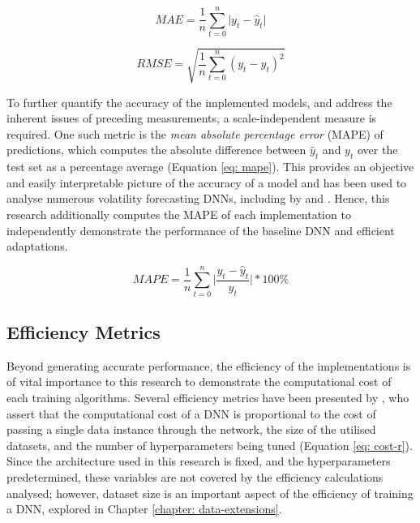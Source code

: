 \documentclass[a4paper, 11pt]{report}
\begin{document}
    \begin{equation}
        \label{eq: mae}
        MAE = \frac{1}{n} \sum_{t=0}^n \lvert y_t - \hat{y}_t \lvert
    \end{equation}
    
    \begin{equation}
        \label{eq: rmse}
        RMSE = \sqrt{\frac{1}{n} \sum_{t=0}^n (y_t - \hat{y}_t)^2}
    \end{equation}


    To further quantify the accuracy of the implemented models, and address the inherent issues of preceding measurements, a scale-independent measure is required. One such metric is the \emph{mean absolute percentage error }(MAPE) of predictions, which computes the absolute difference between $\hat{y}_t$ and $y_t$ over the test set as a percentage average (Equation \ref{eq: mape}). This provides an objective and easily interpretable picture of the accuracy of a model and has been used to analyse numerous volatility forecasting DNNs, including by \citet{xiong-2016} and \citet{zhang-2022}. Hence, this research additionally computes the MAPE of each implementation to independently demonstrate the performance of the baseline DNN and efficient adaptations.


    \begin{equation}
        \label{eq: mape}
        MAPE = \frac{1}{n} \sum_{t=0}^n \bigg\lvert \frac{y_t - \hat{y}_t}{y_t} \bigg\lvert * 100\%
    \end{equation}


    \subsection{Efficiency Metrics}
    \label{section: efficiency-metrics}

    Beyond generating accurate performance, the efficiency of the implementations is of vital importance to this research to demonstrate the computational cost of each training algorithms. Several efficiency metrics have been presented by \citet{schwartz-2019}, who assert that the computational cost of a DNN is proportional to the cost of passing a single data instance through the network, the size of the utilised datasets, and the number of hyperparameters being tuned (Equation \ref{eq: cost-r}). Since the architecture used in this research is fixed, and the hyperparameters predetermined, these variables are not covered by the efficiency calculations analysed; however, dataset size is an important aspect of the efficiency of training a DNN, explored in Chapter \ref{chapter: data-extensions}.
\end{document}
